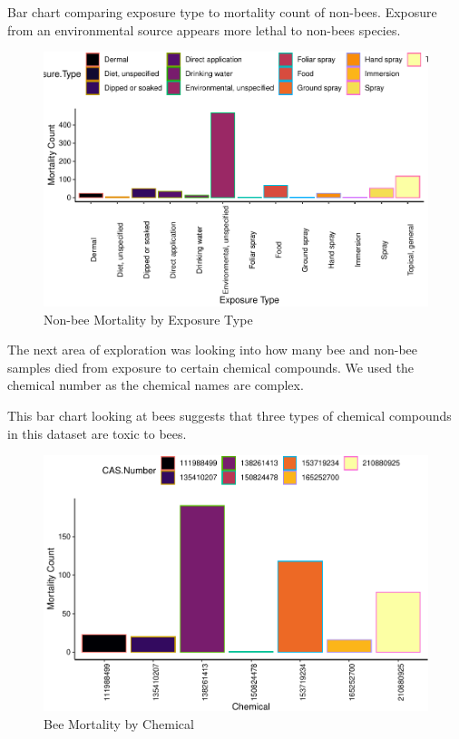 \documentclass[
  12pt,
]{article}
\begin{document}
Bar chart comparing exposure type to mortality count of non-bees.
Exposure from an environmental source appears more lethal to non-bees
species.

\begin{figure}
\centering
\includegraphics{UpdatedwithModel_files/figure-latex/unnamed-chunk-4-1.pdf}
\caption{Non-bee Mortality by Exposure Type}
\end{figure}

The next area of exploration was looking into how many bee and non-bee
samples died from exposure to certain chemical compounds. We used the
chemical number as the chemical names are complex.

This bar chart looking at bees suggests that three types of chemical
compounds in this dataset are toxic to bees.

\begin{figure}
\centering
\includegraphics{UpdatedwithModel_files/figure-latex/unnamed-chunk-5-1.pdf}
\caption{Bee Mortality by Chemical}
\end{figure}
\end{document}
